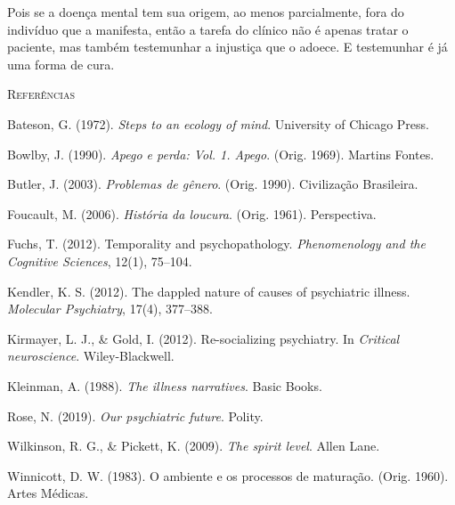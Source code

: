 Pois se a doença mental tem sua origem, ao menos parcialmente, fora do indivíduo que a manifesta, então a tarefa do clínico não é apenas tratar o paciente, mas também testemunhar a injustiça que o adoece. E testemunhar é já uma forma de cura.

\vspace{2em}
\begin{small}
\noindent\textsc{Referências}

\vspace{1em}
\noindent Bateson, G. (1972). \textit{Steps to an ecology of mind}. University of Chicago Press.

\noindent Bowlby, J. (1990). \textit{Apego e perda: Vol. 1. Apego}. (Orig. 1969). Martins Fontes.

\noindent Butler, J. (2003). \textit{Problemas de gênero}. (Orig. 1990). Civilização Brasileira.

\noindent Foucault, M. (2006). \textit{História da loucura}. (Orig. 1961). Perspectiva.

\noindent Fuchs, T. (2012). Temporality and psychopathology. \textit{Phenomenology and the Cognitive Sciences}, 12(1), 75--104.

\noindent Kendler, K. S. (2012). The dappled nature of causes of psychiatric illness. \textit{Molecular Psychiatry}, 17(4), 377--388.

\noindent Kirmayer, L. J., \& Gold, I. (2012). Re-socializing psychiatry. In \textit{Critical neuroscience}. Wiley-Blackwell.

\noindent Kleinman, A. (1988). \textit{The illness narratives}. Basic Books.

\noindent Rose, N. (2019). \textit{Our psychiatric future}. Polity.

\noindent Wilkinson, R. G., \& Pickett, K. (2009). \textit{The spirit level}. Allen Lane.

\noindent Winnicott, D. W. (1983). O ambiente e os processos de maturação. (Orig. 1960). Artes Médicas.
\end{small}
